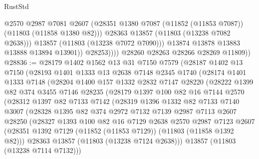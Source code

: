 \begin{lexlean}{RustStd}
\begin{coremodule}
                        @2570
                        @2987
                        @7081
                        @2607
                        (@28351 @1380 @7087 (@11852 (@11853 @7087)) (@11803 (@11858 @1380 @82)))
                        @28363
                        @13857
                        (@11803 (@13238 @7082 @2638)))
                      @13857
                      (@11803 (@13238 @7072 @7090)))
                    @13874
                    @13878
                    @13883
                    @13888
                    @13894
                    @13901))
                @28253))))
        @28260
        @28263
        @28266
        @28269
        @11809))
@28836 := @28179
    @1402
    @1562
    @13
    @31
    @7150
    @7579
    (@28187
      @1402
      @13
      @7150
      (@28193
        @1401
        @1333
        @13
        @2638
        @7148
        @2345
        @1740
        (@28174
          @1401
          @1333
          @7148
          (@28204
            @1400
            @157
            @1332
            @2832
            @7147
            @28220
            (@28222
              @1399
              @82
              @374
              @3455
              @7146
              @28235
              (@28179
                @1397
                @100
                @82
                @16
                @7144
                @2570
                (@28312
                  @1397
                  @82
                  @7133
                  @7142
                  (@28319
                    @1396
                    @1332
                    @82
                    @7133
                    @7140
                    @3007
                    (@28328
                      @1395
                      @82
                      @374
                      @2972
                      @7132
                      @7139
                      @2987
                      @7113
                      @2607
                      @28250
                      (@28327
                        @1393
                        @100
                        @82
                        @16
                        @7129
                        @2638
                        @2570
                        @2987
                        @7123
                        @2607
                        (@28351 @1392 @7129 (@11852 (@11853 @7129)) (@11803 (@11858 @1392 @82)))
                        @28363
                        @13857
                        (@11803 (@13238 @7124 @2638)))
                      @13857
                      (@11803 (@13238 @7114 @7132)))

\end{coremodule}
\end{lexlean}

